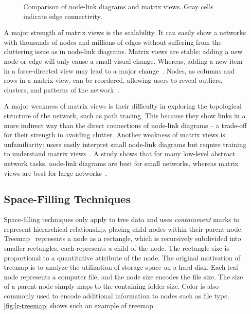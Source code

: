 \begin{figure}[!htb]
\centering
{}
\hfill
{}
\hfill
{}
\caption{Comparison of node-link diagrams and matrix views. Gray cells indicate edge connectivity. }
\label{fig:lr-matrix}
\end{figure}

A major strength of matrix views is the scalability. It can easily show a networks with thousands of nodes and millions of edges without suffering from the cluttering issue as in node-link diagrams. Matrix views are stable: adding a new node or edge will only cause a small visual change. Whereas, adding a new item in a force-directed view may lead to a major change~\cite{Munzner2014}. Nodes, as columns and rows in a matrix view, can be reordered, allowing users to reveal outliers, clusters, and patterns of the network~\cite{Henry2007}.

A major weakness of matrix views is their difficulty in exploring the topological structure of the network, such as path tracing. This because they show links in a more indirect way than the direct connections of node-link diagrams -- a trade-off for their strength in avoiding clutter. Another weakness of matrix views is unfamiliarity: users easily interpret small node-link diagrams but require training to understand matrix views~\cite{Munzner2014}. A study shows that for many low-level abstract network tasks, node-link diagrams are best for small networks, whereas matrix views are best for large networks~\cite{Ghoniem2005}.

\subsection{Space-Filling Techniques}
Space-filling techniques only apply to tree data and uses \emph{containment} marks to represent hierarchical relationship, placing child nodes within their parent node. Treemap~\cite{Shneiderman1992} represents a node as a rectangle, which is recursively subdivided into smaller rectangles, each represents a child of the node. The rectangle size is proportional to a quantitative attribute of the node. The original motivation of treemap is to analyze the utilization of storage space on a hard disk. Each leaf node represents a computer file, and the node size encodes the file size. The size of a parent node simply maps to the containing folder size. Color is also commonly used to encode additional information to nodes such as file type. \autoref{fig:lr-treemap} shows such an example of treemap.

